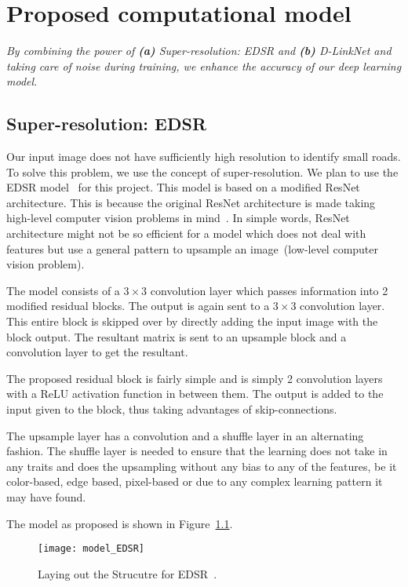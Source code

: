 \chapter{Proposed computational model}\label{chapt:model}
\textit{By combining the power of \textbf{(a)} Super-resolution: EDSR and \textbf{(b)} D-LinkNet and taking care of noise during training, we enhance the accuracy of our deep learning model.}

\section{Super-resolution: EDSR}
Our input image does not have sufficiently high resolution to identify small roads. To solve this problem, we use the concept of super-resolution. We plan to use the EDSR model~\cite{EDSR} for this project. This model is based on a modified ResNet architecture. This is because the original ResNet architecture is made taking high-level computer vision problems in mind~\cite{khan2019surveyResNet}. In simple words, ResNet architecture might not be so efficient for a model which does not deal with features but use a general pattern to upsample an image~(low-level computer vision problem). 

The model consists of a $3\times3$ convolution layer which passes information into 2 modified residual blocks. The output is again sent to a $3\times3$ convolution layer. This entire block is skipped over by directly adding the input image with the block output. The resultant matrix is sent to an upsample block and a convolution layer to get the resultant.

The proposed residual block is fairly simple and is simply 2 convolution layers with a ReLU activation function in between them. The output is added to the input given to the block, thus taking advantages of skip-connections.

The upsample layer has a convolution and a shuffle layer in an alternating fashion. The shuffle layer is needed to ensure that the learning does not take in any traits and does the upsampling without any bias to any of the features, be it color-based, edge based, pixel-based or due to any complex learning pattern it may have found.

The model as proposed is shown in Figure~\ref{fig:model_EDSR}.

\begin{figure}[h!]
  \centering
  \texttt{[image: model\_EDSR]}
  \caption[Laying out the Strucutre for EDSR]{Laying out the Strucutre for EDSR~\cite{EDSR}.}
  \label{fig:model_EDSR}
\end{figure}


